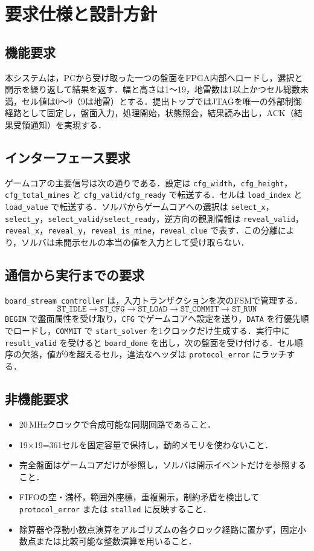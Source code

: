 \chapter{要求仕様と設計方針}
\label{ch:requirements}

\section{機能要求}
本システムは，PCから受け取った一つの盤面をFPGA内部へロードし，選択と開示を繰り返して結果を返す．幅と高さは1〜19，地雷数は1以上かつセル総数未満，セル値は0〜9（9は地雷）とする．提出トップではJTAGを唯一の外部制御経路として固定し，盤面入力，処理開始，状態照会，結果読み出し，ACK（結果受領通知）を実現する．

\section{インターフェース要求}
ゲームコアの主要信号は次の通りである．設定は \texttt{cfg\_width}，\texttt{cfg\_height}，\texttt{cfg\_total\_mines} と \texttt{cfg\_valid/cfg\_ready} で転送する．セルは \texttt{load\_index} と \texttt{load\_value} で転送する．ソルバからゲームコアへの選択は \texttt{select\_x}，\texttt{select\_y}，\texttt{select\_valid/select\_ready}，逆方向の観測情報は \texttt{reveal\_valid}，\texttt{reveal\_x}，\texttt{reveal\_y}，\texttt{reveal\_is\_mine}，\texttt{reveal\_clue} で表す．この分離により，ソルバは未開示セルの本当の値を入力として受け取らない．

\section{通信から実行までの要求}
\texttt{board\_stream\_controller} は，入力トランザクションを次のFSMで管理する．
\[
\texttt{ST\_IDLE}\rightarrow\texttt{ST\_CFG}\rightarrow\texttt{ST\_LOAD}\rightarrow\texttt{ST\_COMMIT}\rightarrow\texttt{ST\_RUN}
\]
\texttt{BEGIN} で盤面属性を受け取り，\texttt{CFG} でゲームコアへ設定を送り，\texttt{DATA} を行優先順でロードし，\texttt{COMMIT} で \texttt{start\_solver} を1クロックだけ生成する．実行中に \texttt{result\_valid} を受けると \texttt{board\_done} を出し，次の盤面を受け付ける．セル順序の欠落，値が9を超えるセル，違法なヘッダは \texttt{protocol\_error} にラッチする．

\section{非機能要求}
\begin{itemize}
  \item 20\,MHzクロックで合成可能な同期回路であること．
  \item 19\(\times\)19=361セルを固定容量で保持し，動的メモリを使わないこと．
  \item 完全盤面はゲームコアだけが参照し，ソルバは開示イベントだけを参照すること．
  \item FIFOの空・満杯，範囲外座標，重複開示，制約矛盾を検出して \texttt{protocol\_error} または \texttt{stalled} に反映すること．
  \item 除算器や浮動小数点演算をアルゴリズムの各クロック経路に置かず，固定小数点または比較可能な整数演算を用いること．
\end{itemize}

